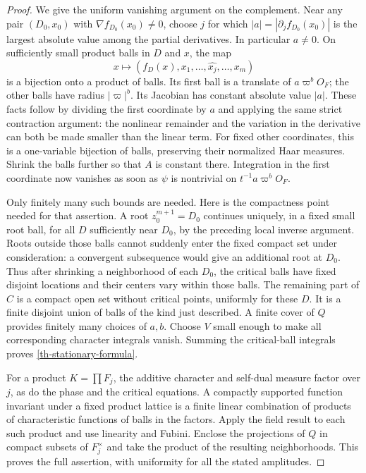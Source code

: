 \begin{proof}
We give the uniform vanishing argument on the complement.  Near any
pair $(D_0,x_0)$ with $\nabla f_{D_0}(x_0)\ne0$, choose $j$ for which
$|a|=|\partial_jf_{D_0}(x_0)|$ is the largest absolute value among
the partial derivatives.  In particular $a\ne0$.  On sufficiently small product balls
in $D$ and $x$, the map
\[
 x\longmapsto(f_D(x),x_1,\ldots,\widehat{x_j},\ldots,x_m)
\]
is a bijection onto a product of balls.  Its first ball is a translate
of $a\varpi^bO_F$; the other balls have radius $|\varpi|^b$.
Its Jacobian has constant absolute value $|a|$.  These facts follow
by dividing the first coordinate by $a$ and applying the same strict
contraction argument: the nonlinear remainder and the variation in
the derivative can both be made smaller than the linear term.
For fixed other coordinates, this is a one-variable bijection of
balls, preserving their normalized Haar measures.  Shrink the
balls further so that $A$ is constant there.  Integration in the
first coordinate now vanishes as soon as
$\psi$ is nontrivial on $t^{-1}a\varpi^bO_F$.

Only finitely many such bounds are needed.  Here is the compactness
point needed for that assertion.  A root $z_0^{m+1}=D_0$ continues
uniquely, in a fixed small root ball, for all $D$ sufficiently near
$D_0$, by the preceding local inverse argument.  Roots outside those
balls cannot suddenly enter the fixed compact set under consideration:
a convergent subsequence would give an additional root at $D_0$.
Thus after shrinking a neighborhood of each $D_0$, the critical
balls have fixed disjoint locations and their centers vary within
those balls.  The remaining part of $C$ is a compact open set without
critical points, uniformly for these $D$.  It is a finite disjoint
union of balls of the kind just described.  A finite cover of $Q$
provides finitely many choices of $a,b$.  Choose $V$ small enough to
make all corresponding character integrals vanish.  Summing the
critical-ball integrals proves \eqref{th-stationary-formula}.

For a product $K=\prod F_j$, the additive character and self-dual
measure factor over $j$, as do the phase and the critical equations.
A compactly supported function invariant under a fixed product
lattice is a finite linear combination of products of characteristic
functions of balls in the factors.  Apply the field result to each
such product and use linearity and Fubini.  Enclose the projections
of $Q$ in compact subsets of $F_j^\times$ and take the product of the
resulting neighborhoods.  This proves the full assertion, with
uniformity for all the stated amplitudes.
\end{proof}


